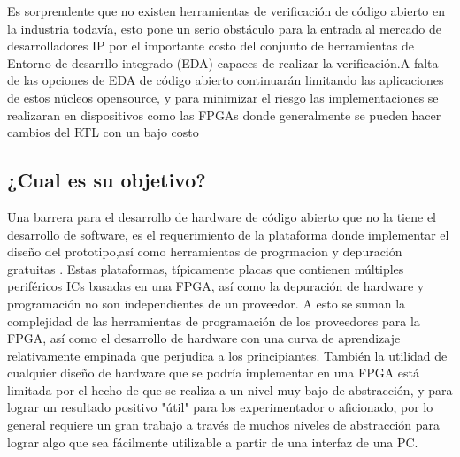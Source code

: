 Es sorprendente que no existen herramientas de verificación de código abierto en la industria todavía, esto pone un serio obstáculo para la entrada al mercado de desarrolladores IP por el importante costo del conjunto de herramientas de Entorno de desarrllo integrado (EDA) capaces de realizar la verificación.A falta de las opciones de EDA de código abierto continuarán limitando las aplicaciones de estos núcleos opensource, y para minimizar el riesgo las implementaciones se realizaran en dispositivos como las FPGAs donde generalmente se pueden hacer cambios  del RTL con un bajo costo 
 

	\subsection{¿Cual es su objetivo? }


Una barrera para el desarrollo de hardware de código abierto que no la tiene el desarrollo de software, es el requerimiento de la plataforma donde implementar el diseño del prototipo,así como herramientas  de progrmacion y depuración gratuitas . Estas plataformas, típicamente placas que contienen múltiples periféricos ICs basadas en una FPGA, así como la depuración de hardware y programación no son independientes de un proveedor. A esto se suman la complejidad de las herramientas de programación de los proveedores para la FPGA, así como el desarrollo de hardware con una curva de aprendizaje relativamente empinada que perjudica a los principiantes.
También  la utilidad de cualquier diseño de hardware que se podría implementar en una FPGA está limitada por el hecho de que se realiza a un nivel muy bajo de abstracción, y para lograr un resultado positivo "útil" para los experimentador o aficionado, por lo general requiere un gran trabajo a través de muchos niveles de abstracción para lograr algo que sea fácilmente utilizable a partir de una interfaz de una PC. 

